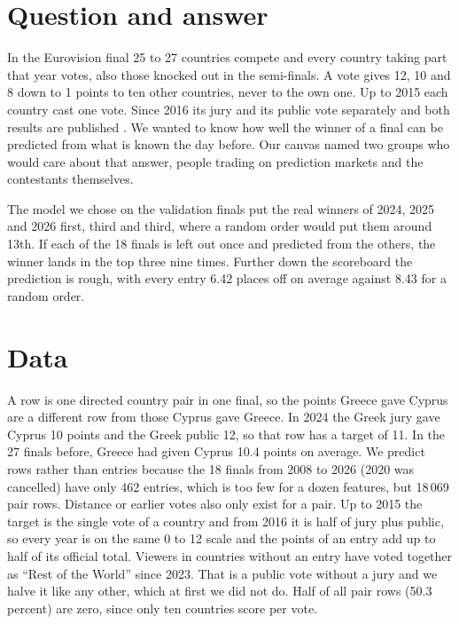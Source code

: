 \section{Question and answer}

In the Eurovision final 25 to 27 countries compete and every country taking part that year votes, also those knocked out in the semi-finals. A vote gives 12, 10 and 8 down to 1 points to ten other countries, never to the own one. Up to 2015 each country cast one vote. Since 2016 its jury and its public vote separately and both results are published \citep{adamska2025}. We wanted to know how well the winner of a final can be predicted from what is known the day before. Our canvas named two groups who would care about that answer, people trading on prediction markets and the contestants themselves.

The model we chose on the validation finals put the real winners of 2024, 2025 and 2026 first, third and third, where a random order would put them around 13th. If each of the 18 finals is left out once and predicted from the others, the winner lands in the top three nine times. Further down the scoreboard the prediction is rough, with every entry 6.42 places off on average against 8.43 for a random order.

\section{Data}

A row is one directed country pair in one final, so the points Greece gave Cyprus are a different row from those Cyprus gave Greece. In 2024 the Greek jury gave Cyprus 10 points and the Greek public 12, so that row has a target of 11. In the 27 finals before, Greece had given Cyprus 10.4 points on average. We predict rows rather than entries because the 18 finals from 2008 to 2026 (2020 was cancelled) have only 462 entries, which is too few for a dozen features, but 18\,069 pair rows. Distance or earlier votes also only exist for a pair. Up to 2015 the target is the single vote of a country and from 2016 it is half of jury plus public, so every year is on the same 0 to 12 scale and the points of an entry add up to half of its official total. Viewers in countries without an entry have voted together as ``Rest of the World'' since 2023. That is a public vote without a jury and we halve it like any other, which at first we did not do. Half of all pair rows (50.3 percent) are zero, since only ten countries score per vote.

